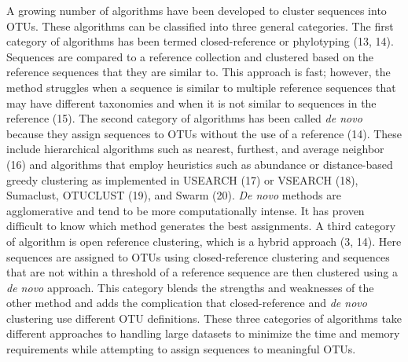 \documentclass[11pt,]{article}
\begin{document}
A growing number of algorithms have been developed to cluster sequences
into OTUs. These algorithms can be classified into three general
categories. The first category of algorithms has been termed
closed-reference or phylotyping (13, 14). Sequences are compared to a
reference collection and clustered based on the reference sequences that
they are similar to. This approach is fast; however, the method
struggles when a sequence is similar to multiple reference sequences
that may have different taxonomies and when it is not similar to
sequences in the reference (15). The second category of algorithms has
been called \emph{de novo} because they assign sequences to OTUs without
the use of a reference (14). These include hierarchical algorithms such
as nearest, furthest, and average neighbor (16) and algorithms that
employ heuristics such as abundance or distance-based greedy clustering
as implemented in USEARCH (17) or VSEARCH (18), Sumaclust, OTUCLUST
(19), and Swarm (20). \emph{De novo} methods are agglomerative and tend
to be more computationally intense. It has proven difficult to know
which method generates the best assignments. A third category of
algorithm is open reference clustering, which is a hybrid approach (3,
14). Here sequences are assigned to OTUs using closed-reference
clustering and sequences that are not within a threshold of a reference
sequence are then clustered using a \emph{de novo} approach. This
category blends the strengths and weaknesses of the other method and
adds the complication that closed-reference and \emph{de novo}
clustering use different OTU definitions. These three categories of
algorithms take different approaches to handling large datasets to
minimize the time and memory requirements while attempting to assign
sequences to meaningful OTUs.
\end{document}
